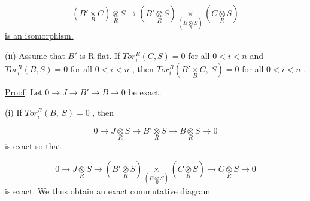 \begin{equation*}
(B'\underset{B}{\times} C) \underset{R}{\otimes} S \to (B'\underset{R}{\otimes} S) \underset{(B \underset{R}{\otimes} S)}{\times} (C \underset{R}{\otimes} S)
\end{equation*}
\underline{is an isomorphism.}

(ii)  \underline{Assume that}  $B'$  \underline{is R-flat.} \underline{If}  $Tor^{R}_{i}(C,S) = 0$  \underline{for all}  $0 < i < n$  \underline{and}  $Tor^{R}_{i}(B,S) = 0$  \underline{for all}  $0 < i < n$  , \underline{then}  $Tor^{R}_{i}(B'\underset{B}{\times}C,\ S) = 0$  \underline{for all}  $0 < i < n$  .

\underline{Proof}:  Let  $0 \to J \to B' \to B \to 0$  be exact.

(i)  If  $Tor^{R}_{i}(B,\ S) = 0$  , then

\begin{equation*}
0 \to J\underset{R}{\otimes}S \to B'\underset{R}{\otimes}S \to B\underset{R}{\otimes}S \to 0
\end{equation*}
is exact so that

\begin{equation*}
0 \to J\underset{R}{\otimes}S \to (B'\underset{R}{\otimes}S) \underset{(B\underset{R}{\otimes}S)}{\times} (C\underset{R}{\otimes}S) \to C\underset{R}{\otimes}S \to 0
\end{equation*}
is exact. We thus obtain an exact commutative diagram



